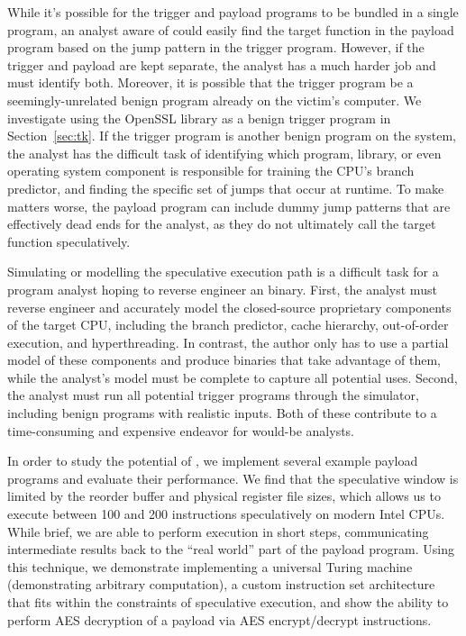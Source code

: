 While it's possible for the trigger and payload programs to be bundled in a
single program, an analyst aware of \speculake could easily find the target
function in the payload program based on the jump pattern in the trigger program.
However, if the trigger and payload are kept separate, the analyst has a much
harder job and must identify both.
Moreover, it is possible that the trigger program be a
seemingly-unrelated benign program already on the victim's computer. We
investigate using the OpenSSL library as a benign trigger
program in Section~\ref{sec:tk}. If the trigger program is another benign
program on the system, the analyst has the difficult task of identifying which
program, library, or even operating system component is responsible for training
the CPU's branch predictor, and finding the specific set of jumps that occur at
runtime. To make matters worse, the payload program can include dummy jump
patterns that are effectively dead ends for the analyst, as they do not
ultimately call the target function speculatively.


Simulating or modelling the speculative execution path is a difficult task for a
program analyst hoping to reverse engineer an \speculake binary. First, the
analyst must reverse engineer and accurately model the closed-source proprietary
components of the target CPU, including the branch predictor, cache hierarchy,
out-of-order execution, and hyperthreading. In contrast, the \speculake
author only has to use a partial model of these components and produce binaries
that take advantage of them, while the analyst's model must be complete to
capture all potential \speculake uses. Second, the analyst must run all
potential trigger programs through the simulator, including benign programs with
realistic inputs. Both of these contribute to a time-consuming and expensive
endeavor for would-be analysts.

In order to study the potential of \speculake, we implement several example
payload programs and evaluate their performance.
We find that the speculative window is limited by the reorder buffer
and physical register file sizes, which allows us to execute between 100 and 200 instructions
speculatively on modern Intel CPUs. While brief, we are able to perform
execution in short steps, communicating intermediate results back to the ``real
world'' part of the payload program. Using this technique,
we demonstrate implementing a universal Turing machine
(demonstrating arbitrary computation), a custom instruction set architecture
that fits within the constraints of speculative execution, and show
the ability to perform AES decryption
of a payload via AES encrypt/decrypt instructions.

